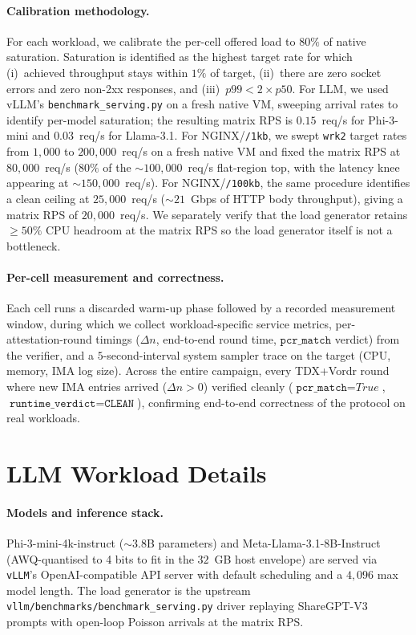 \paragraph{Calibration methodology.}
For each workload, we calibrate the per-cell offered load to $80\%$
of native saturation. Saturation is identified as the highest target
rate for which (i)~achieved throughput stays within $1\%$ of target,
(ii)~there are zero socket errors and zero non-2xx responses, and
(iii)~$p99 < 2 \times p50$. For LLM, we used vLLM's
\texttt{benchmark\_serving.py} on a fresh native VM, sweeping
arrival rates to identify per-model saturation; the resulting matrix
RPS is $0.15$~req/s for Phi-3-mini and $0.03$~req/s for Llama-3.1.
For NGINX/\texttt{/1kb}, we swept \texttt{wrk2} target rates from
$1{,}000$ to $200{,}000$~req/s on a fresh native VM and fixed the matrix
RPS at $80{,}000$~req/s ($80\%$ of the $\sim$$100{,}000$~req/s flat-region
top, with the latency knee appearing at $\sim$$150{,}000$~req/s). For
NGINX/\texttt{/100kb}, the same procedure identifies a clean ceiling
at $25{,}000$~req/s ($\sim$$21$~Gbps of HTTP body throughput), giving
a matrix RPS of $20{,}000$~req/s. We separately verify that the load
generator retains $\geq{}50\%$ CPU headroom at the matrix RPS so the
load generator itself is not a bottleneck.

\paragraph{Per-cell measurement and correctness.}
Each cell runs a discarded warm-up phase followed by a recorded
measurement window, during which we collect workload-specific service
metrics, per-attestation-round timings ($\Delta n$, end-to-end round
time, $\texttt{pcr\_match}$ verdict) from the verifier, and a
$5$-second-interval system sampler trace on the target (CPU, memory,
IMA log size). Across the entire campaign, every TDX+Vordr round
where new IMA entries arrived ($\Delta n > 0$) verified cleanly
($\texttt{pcr\_match}{=}\textit{True}$,
$\texttt{runtime\_verdict}{=}\texttt{CLEAN}$), confirming end-to-end
correctness of the protocol on real workloads.

\section{LLM Workload Details}
\label{app:llm-detail}

\paragraph{Models and inference stack.}
Phi-3-mini-4k-instruct ($\sim$3.8B parameters) and
Meta-Llama-3.1-8B-Instruct (AWQ-quantised to 4 bits to fit in the
$32$~GB host envelope) are served via \texttt{vLLM}'s
OpenAI-compatible API server with default scheduling and a $4{,}096$
max model length. The load generator is the upstream
\texttt{vllm/benchmarks/benchmark\_serving.py} driver replaying
ShareGPT-V3 prompts with open-loop Poisson arrivals at the matrix RPS.

